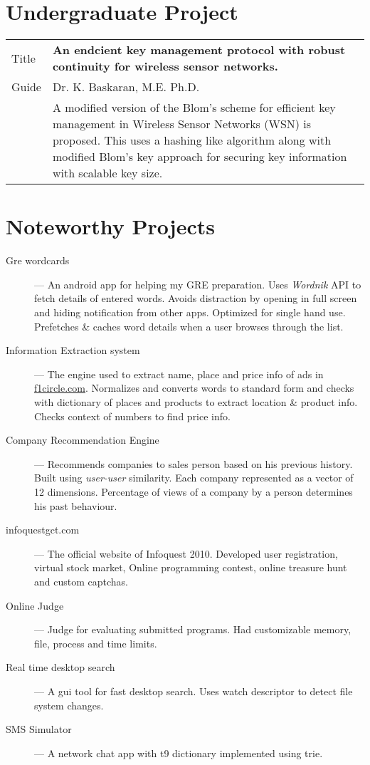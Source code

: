 \documentclass{resume}
\begin{document}
\section{Undergraduate Project}
\begin{tabular}{l p{5.6in}}
  Title & \textbf{An endcient key management protocol with robust continuity for wireless sensor networks.}\\
  Guide & Dr. K. Baskaran, M.E. Ph.D.\\
        & A modified version of the Blom's scheme for efficient key management in Wireless Sensor Networks (WSN) is proposed.  This uses a hashing like algorithm along with modified Blom's key approach for securing key information with scalable key size.
\end{tabular}

\section{Noteworthy Projects}
\begin{description}
  \item[Gre wordcards] --- An android app for helping my GRE preparation.  Uses \textit{Wordnik} API to fetch details of entered words.  Avoids distraction by opening in full screen and hiding notification from other apps. Optimized for single hand use.  Prefetches \& caches word details when a user browses through the list.
  \item[Information Extraction system] --- The engine used to extract name, place and price info of ads in \url{f1circle.com}.  Normalizes and converts words to standard form and checks with dictionary of places and products to extract location \& product info.  Checks context of numbers to find price info.
  \item[Company Recommendation Engine] --- Recommends companies to sales person based on his previous history.  Built using \textit{user-user} similarity. Each company represented as a vector of 12 dimensions.  Percentage of views of a company by a person determines his past behaviour.
  \item[infoquestgct.com] --- The official website of Infoquest 2010. Developed user registration, virtual stock market, Online programming contest, online treasure hunt and custom captchas.
  \item[Online Judge] --- Judge for evaluating submitted programs.  Had customizable memory, file, process and time limits.
  \item[Real time desktop search] --- A gui tool for fast desktop search.  Uses watch descriptor to detect file system changes.
  \item[SMS Simulator] --- A network chat app with t9 dictionary implemented using trie.
\end{description}
\end{document}
